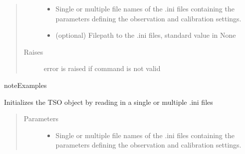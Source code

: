 \documentclass[a4paper,10pt,english]{sphinxmanual}
\begin{document}
\begin{fulllineitems}
\begin{fulllineitems}
\begin{quote}
\begin{description}
\begin{itemize}
\item {} 
 \textendash{} Single or multiple file names of the .ini files containing the
parameters defining the observation and calibration settings.

\item {} 
 \textendash{} (optional) Filepath to the .ini files, standard value in None

\end{itemize}

\item[{Raises}] \leavevmode
{} \textendash{} error is raised if command is not valid

\end{description}\end{quote}

\begin{sphinxadmonition}{note}{Examples}

%
\begin{sphinxVerbatim}[commandchars=\\\{\}]
\end{sphinxVerbatim}
\end{sphinxadmonition}

\end{fulllineitems}


\begin{fulllineitems}
\label{\detokenize{cascade.TSO:cascade.TSO.TSO.TSOSuite.initialize_TSO}}
Initializes the TSO object by reading in a single or
multiple .ini files
\begin{quote}\begin{description}
\item[{Parameters}] \leavevmode\begin{itemize}
\item {} 
 \textendash{} Single or multiple file names of the .ini files containing the
parameters defining the observation and calibration settings.


\end{itemize}
\end{description}
\end{quote}
\end{fulllineitems}
\end{fulllineitems}
\end{document}
